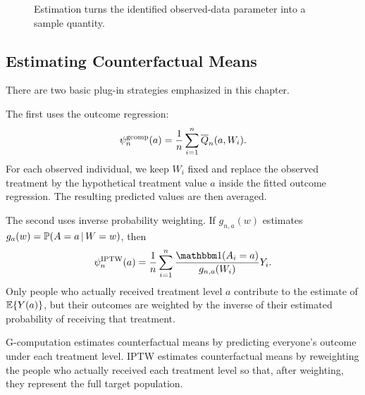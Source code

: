 \begin{figure}[H]
\centering
{}
\caption{Estimation turns the identified observed-data parameter into a sample quantity.}
\label{fig:ch4-estimation-flow}
\end{figure}

\subsection{Estimating Counterfactual Means}

There are two basic plug-in strategies emphasized in this chapter.

The first uses the outcome regression:
\[
\psi_n^{\mathrm{gcomp}}(a)=\frac{1}{n}\sum_{i=1}^n \overline{Q}_n(a,W_i).
\]
For each observed individual, we keep $W_i$ fixed and replace the observed treatment
by the hypothetical treatment value $a$ inside the fitted outcome regression. The
resulting predicted values are then averaged.

The second uses inverse probability weighting. If $g_{n,a}(w)$ estimates
$g_a(w)=\mathbb{P}(A=a\,\vert\, W=w)$, then
\[
\psi_n^{\IPTW}(a)
=
\frac{1}{n}\sum_{i=1}^n
\frac{\ind(A_i=a)}{g_{n,a}(W_i)}Y_i.
\]
Only people who actually received treatment level $a$ contribute to the estimate of
$\mathbb{E}\{Y(a)\}$, but their outcomes are weighted by the inverse of their estimated
probability of receiving that treatment.

\begin{keyidea}
G-computation estimates counterfactual means by predicting everyone's outcome under
each treatment level. IPTW estimates counterfactual means by reweighting the people
who actually received each treatment level so that, after weighting, they represent the
full target population.
\end{keyidea}

